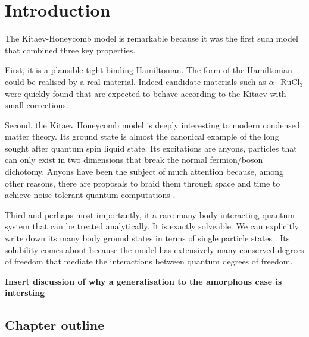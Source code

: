 \begin{Shaded}
\begin{Highlighting}[]
\OperatorTok{\%\%}
\end{Highlighting}
\end{Shaded}

\hypertarget{introduction}{%
\section{Introduction}\label{introduction}}

The Kitaev-Honeycomb model is remarkable because it was the first such
model that combined three key properties.

First, it is a plausible tight binding Hamiltonian. The form of the
Hamiltonian could be realised by a real material. Indeed candidate
materials such as \(\alpha\mathrm{-RuCl}_3\) were quickly found
\autocite{banerjeeProximateKitaevQuantum2016,trebstKitaevMaterials2022}
that are expected to behave according to the Kitaev with small
corrections.

Second, the Kitaev Honeycomb model is deeply interesting to modern
condensed matter theory. Its ground state is almost the canonical
example of the long sought after quantum spin liquid state. Its
excitations are anyons, particles that can only exist in two dimensions
that break the normal fermion/boson dichotomy. Anyons have been the
subject of much attention because, among other reasons, there are
proposals to braid them through space and time to achieve noise tolerant
quantum computations
\textcite{freedmanTopologicalQuantumComputation2003}.

Third and perhaps most importantly, it a rare many body interacting
quantum system that can be treated analytically. It is exactly
solveable. We can explicitly write down its many body ground states in
terms of single particle states
\textcite{kitaevAnyonsExactlySolved2006}. Its solubility comes about
because the model has extensively many conserved degrees of freedom that
mediate the interactions between quantum degrees of freedom.

\textbf{Insert discussion of why a generalisation to the amorphous case
is intersting}

\hypertarget{chapter-outline}{%
\subsection{Chapter outline}\label{chapter-outline}}

